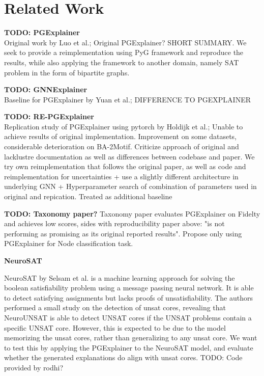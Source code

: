 \chapter{Related Work}

\textbf{TODO: PGExplainer} \\
Original work by Luo et al.\cite{luo2020parameterized}; Original PGExplainer? SHORT SUMMARY. We seek to provide a reimplementation using PyG framework and reproduce the results, while also applying the framework to another domain, namely SAT problem in the form of bipartite graphs.\bigskip

\textbf{TODO: GNNExplainer} \\
Baseline for PGExplainer by Yuan et al.\cite{ying2019gnnexplainer}; DIFFERENCE TO PGEXPLAINER

\textbf{TODO: RE-PGExplainer} \\
Replication study of PGExplainer using pytorch by Holdijk et al.\cite{holdijk2021re};
Unable to achieve results of original implementation. Improvement on some datasets, considerable deterioration on BA-2Motif. Criticize approach of original and lacklustre documentation as well as differences between codebase and paper.
We try own reimplementation that follows the original paper, as well as code and reimplementation for uncertainties + use a slightly different architecture in underlying GNN + Hyperparameter search of combination of parameters used in original and repication. Treated as additional baseline\bigskip

\textbf{TODO: Taxonomy paper?}
Taxonomy paper evaluates PGExplainer on Fidelty and achieves low scores, sides with reproducibility paper above: "is not performing as promising as its original
reported results". Propose only using PGExplainer for Node classification task.\bigskip

\textbf{NeuroSAT}

NeuroSAT by Selsam et al.\cite{selsam2018learning} is a machine learning approach for solving the boolean satisfiability problem using a message passing neural network. It is able to detect satisfying assignments but lacks proofs of unsatisfiability. The authors performed a small study on the detection of unsat cores, revealing that NeuroUNSAT is able to detect UNSAT cores if the UNSAT problems contain a specific UNSAT core. However, this is expected to be due to the model memorizing the unsat cores, rather than generalizing to any unsat core. We want to test this by applying the PGExplainer to the NeuroSAT model, and evaluate whether the generated explanations do align with unsat cores. TODO: Code provided by rodhi?